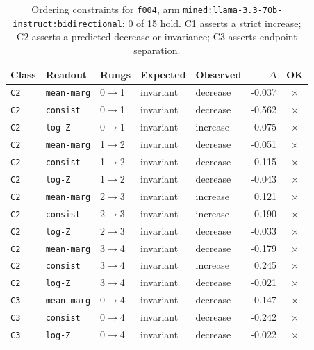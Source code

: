 \documentclass[11pt]{article}
\begin{document}
\begin{table}[htbp]
\centering
\small
\caption{Ordering constraints for \texttt{f004}, arm \texttt{mined:llama-3.3-70b-instruct:bidirectional}: 0 of 15 hold. C1 asserts a strict increase; C2 asserts a predicted decrease or invariance; C3 asserts endpoint separation.}
\label{tab:ladder-f004-mined-llama-3-3-70b-instruct-bidirectional}
\begin{tabular}{lllllrc}
\toprule
Class & Readout & Rungs & Expected & Observed & $\Delta$ & OK \\
\midrule
\texttt{C2} & \texttt{mean-marg} & 0$\to$1 & invariant & decrease & -0.037 & $\times$ \\
\texttt{C2} & \texttt{consist} & 0$\to$1 & invariant & decrease & -0.562 & $\times$ \\
\texttt{C2} & \texttt{log-Z} & 0$\to$1 & invariant & increase & 0.075 & $\times$ \\
\texttt{C2} & \texttt{mean-marg} & 1$\to$2 & invariant & decrease & -0.051 & $\times$ \\
\texttt{C2} & \texttt{consist} & 1$\to$2 & invariant & decrease & -0.115 & $\times$ \\
\texttt{C2} & \texttt{log-Z} & 1$\to$2 & invariant & decrease & -0.043 & $\times$ \\
\texttt{C2} & \texttt{mean-marg} & 2$\to$3 & invariant & increase & 0.121 & $\times$ \\
\texttt{C2} & \texttt{consist} & 2$\to$3 & invariant & increase & 0.190 & $\times$ \\
\texttt{C2} & \texttt{log-Z} & 2$\to$3 & invariant & decrease & -0.033 & $\times$ \\
\texttt{C2} & \texttt{mean-marg} & 3$\to$4 & invariant & decrease & -0.179 & $\times$ \\
\texttt{C2} & \texttt{consist} & 3$\to$4 & invariant & increase & 0.245 & $\times$ \\
\texttt{C2} & \texttt{log-Z} & 3$\to$4 & invariant & decrease & -0.021 & $\times$ \\
\texttt{C3} & \texttt{mean-marg} & 0$\to$4 & invariant & decrease & -0.147 & $\times$ \\
\texttt{C3} & \texttt{consist} & 0$\to$4 & invariant & decrease & -0.242 & $\times$ \\
\texttt{C3} & \texttt{log-Z} & 0$\to$4 & invariant & decrease & -0.022 & $\times$ \\
\bottomrule
\end{tabular}
\end{table}
\end{document}
